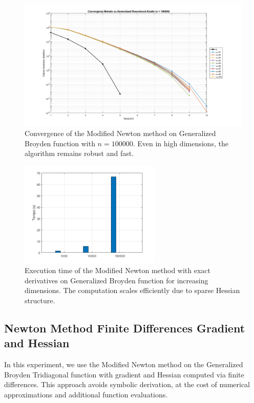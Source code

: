 \documentclass[a4paper,12pt]{article}
\begin{document}
	\begin{figure}[H]
		\centering
		\includegraphics[width=\textwidth]{../immagini/broyden_100k.png}
		\caption{Convergence of the Modified Newton method on Generalized Broyden function with $n=100000$. Even in high dimensions, the algorithm remains robust and fast.}
		\label{fig:gb_100k_exact}
	\end{figure}
	
	\begin{figure}[htbp]
		\centering
		\includegraphics[width=0.6\textwidth]{../immagini/broyden_time_exact.png}
		\caption{Execution time of the Modified Newton method with exact derivatives on Generalized Broyden function for increasing dimensions. The computation scales efficiently due to sparse Hessian structure.}
		\label{fig:gb_time_exact}
	\end{figure}
	
	
	\subsection{Newton Method Finite Differences Gradient and Hessian}
	
	In this experiment, we use the Modified Newton method on the Generalized Broyden Tridiagonal function with gradient and Hessian computed via finite differences. This approach avoids symbolic derivation, at the cost of numerical approximations and additional function evaluations.
	
\end{document}

